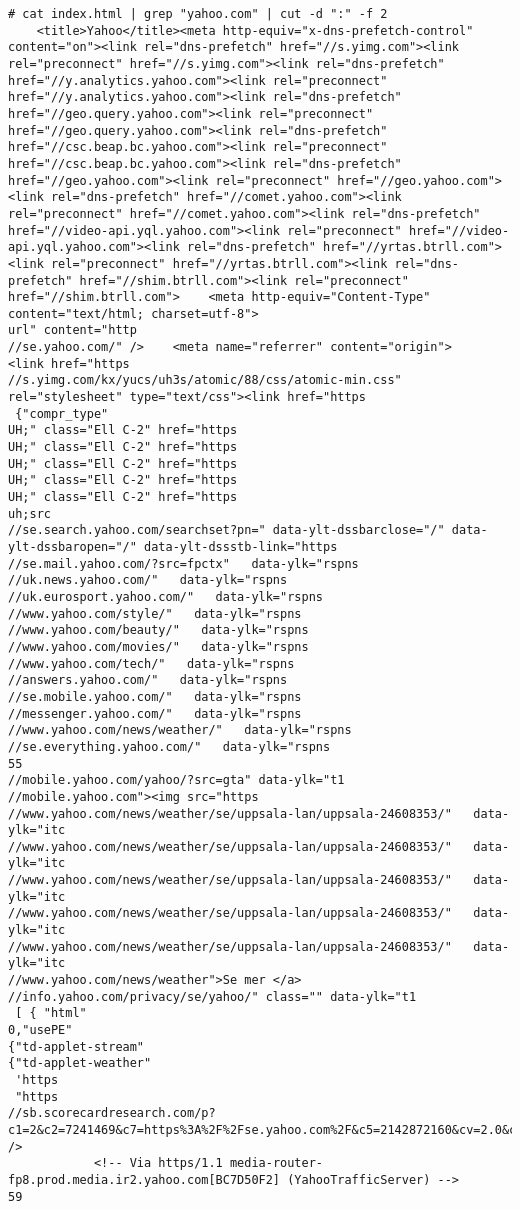 \begin{lstlisting}[numbers=none, language={}, frame=single, framexleftmargin={0.2em}]
# cat index.html | grep "yahoo.com" | cut -d ":" -f 2
    <title>Yahoo</title><meta http-equiv="x-dns-prefetch-control" content="on"><link rel="dns-prefetch" href="//s.yimg.com"><link rel="preconnect" href="//s.yimg.com"><link rel="dns-prefetch" href="//y.analytics.yahoo.com"><link rel="preconnect" href="//y.analytics.yahoo.com"><link rel="dns-prefetch" href="//geo.query.yahoo.com"><link rel="preconnect" href="//geo.query.yahoo.com"><link rel="dns-prefetch" href="//csc.beap.bc.yahoo.com"><link rel="preconnect" href="//csc.beap.bc.yahoo.com"><link rel="dns-prefetch" href="//geo.yahoo.com"><link rel="preconnect" href="//geo.yahoo.com"><link rel="dns-prefetch" href="//comet.yahoo.com"><link rel="preconnect" href="//comet.yahoo.com"><link rel="dns-prefetch" href="//video-api.yql.yahoo.com"><link rel="preconnect" href="//video-api.yql.yahoo.com"><link rel="dns-prefetch" href="//yrtas.btrll.com"><link rel="preconnect" href="//yrtas.btrll.com"><link rel="dns-prefetch" href="//shim.btrll.com"><link rel="preconnect" href="//shim.btrll.com">    <meta http-equiv="Content-Type" content="text/html; charset=utf-8">
url" content="http
//se.yahoo.com/" />    <meta name="referrer" content="origin">        <link href="https
//s.yimg.com/kx/yucs/uh3s/atomic/88/css/atomic-min.css" rel="stylesheet" type="text/css"><link href="https
 {"compr_type"
UH;" class="Ell C-2" href="https
UH;" class="Ell C-2" href="https
UH;" class="Ell C-2" href="https
UH;" class="Ell C-2" href="https
UH;" class="Ell C-2" href="https
uh;src
//se.search.yahoo.com/searchset?pn=" data-ylt-dssbarclose="/" data-ylt-dssbaropen="/" data-ylt-dssstb-link="https
//se.mail.yahoo.com/?src=fpctx"   data-ylk="rspns
//uk.news.yahoo.com/"   data-ylk="rspns
//uk.eurosport.yahoo.com/"   data-ylk="rspns
//www.yahoo.com/style/"   data-ylk="rspns
//www.yahoo.com/beauty/"   data-ylk="rspns
//www.yahoo.com/movies/"   data-ylk="rspns
//www.yahoo.com/tech/"   data-ylk="rspns
//answers.yahoo.com/"   data-ylk="rspns
//se.mobile.yahoo.com/"   data-ylk="rspns
//messenger.yahoo.com/"   data-ylk="rspns
//www.yahoo.com/news/weather/"   data-ylk="rspns
//se.everything.yahoo.com/"   data-ylk="rspns
55
//mobile.yahoo.com/yahoo/?src=gta" data-ylk="t1
//mobile.yahoo.com"><img src="https
//www.yahoo.com/news/weather/se/uppsala-lan/uppsala-24608353/"   data-ylk="itc
//www.yahoo.com/news/weather/se/uppsala-lan/uppsala-24608353/"   data-ylk="itc
//www.yahoo.com/news/weather/se/uppsala-lan/uppsala-24608353/"   data-ylk="itc
//www.yahoo.com/news/weather/se/uppsala-lan/uppsala-24608353/"   data-ylk="itc
//www.yahoo.com/news/weather/se/uppsala-lan/uppsala-24608353/"   data-ylk="itc
//www.yahoo.com/news/weather">Se mer </a>
//info.yahoo.com/privacy/se/yahoo/" class="" data-ylk="t1
 [ { "html"
0,"usePE"
{"td-applet-stream"
{"td-applet-weather"
 'https
 "https
//sb.scorecardresearch.com/p?c1=2&c2=7241469&c7=https%3A%2F%2Fse.yahoo.com%2F&c5=2142872160&cv=2.0&cj=1" />
            <!-- Via https/1.1 media-router-fp8.prod.media.ir2.yahoo.com[BC7D50F2] (YahooTrafficServer) -->
59
\end{lstlisting}

